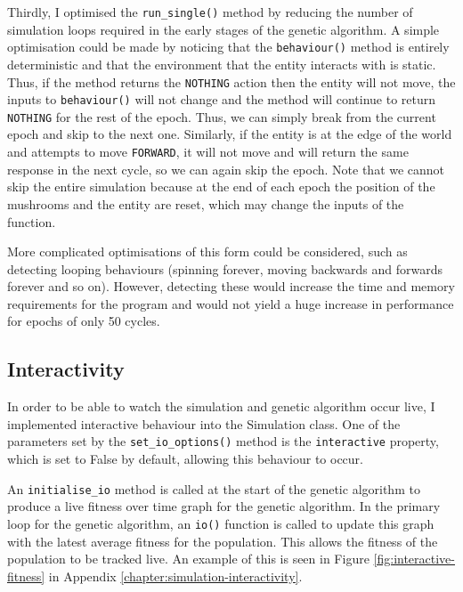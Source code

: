 \documentclass[12pt,a4paper,twoside,openright]{report}
\begin{document}
Thirdly, I optimised the \texttt{run\_single()} method by reducing the number of simulation loops required in the early stages of the genetic algorithm. A simple optimisation could be made by noticing that the \texttt{behaviour()} method is entirely deterministic and that the environment that the entity interacts with is static. Thus, if the method returns the \texttt{NOTHING} action then the entity will not move, the inputs to \texttt{behaviour()} will not change and the method will continue to return \texttt{NOTHING} for the rest of the epoch. Thus, we can simply break from the current epoch and skip to the next one. Similarly, if the entity is at the edge of the world and attempts to move \texttt{FORWARD}, it will not move and will return the same response in the next cycle, so we can again skip the epoch. Note that we cannot skip the entire simulation because at the end of each epoch the position of the mushrooms and the entity are reset, which may change the inputs of the function.

More complicated optimisations of this form could be considered, such as detecting looping behaviours (spinning forever, moving backwards and forwards forever and so on). However, detecting these would increase the time and memory requirements for the program and would  not yield a huge increase in performance for epochs of only 50 cycles.

\subsection{Interactivity}\label{section:interactivity}

In order to be able to watch the simulation and genetic algorithm occur live, I implemented interactive behaviour into the Simulation class. One of the parameters set by the \texttt{set\_io\_options()} method is the \texttt{interactive} property, which is set to False by default, allowing this behaviour to occur.

An \texttt{initialise\_io} method is called at the start of the genetic algorithm to produce a live fitness over time graph for the genetic algorithm. In the primary loop for the genetic algorithm, an \texttt{io()} function is called to update this graph with the latest average fitness for the population. This allows the fitness of the population to be tracked live. An example of this is seen in Figure \ref{fig:interactive-fitness} in Appendix \ref{chapter:simulation-interactivity}.

\end{document}
